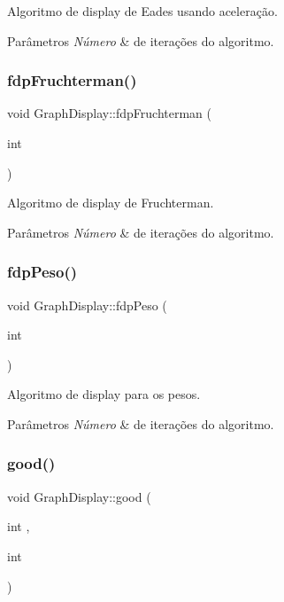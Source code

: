 Algoritmo de display de Eades usando aceleração. 
\begin{DoxyParams}{Parâmetros}
{\em Número} & de iterações do algoritmo. \\
\hline
\end{DoxyParams}
\mbox{\label{classGraphDisplay_aaf2ed129c6647b38b0170133ae4f0823}} 
\subsubsection{\texorpdfstring{fdp\+Fruchterman()}{fdpFruchterman()}}
{\footnotesize\ttfamily void Graph\+Display\+::fdp\+Fruchterman (\begin{DoxyParamCaption}\item[{int}]{ }\end{DoxyParamCaption})}

Algoritmo de display de Fruchterman. 
\begin{DoxyParams}{Parâmetros}
{\em Número} & de iterações do algoritmo. \\
\hline
\end{DoxyParams}
\mbox{\label{classGraphDisplay_a9d55e916fea8b749eaee51def8d004d3}} 
\subsubsection{\texorpdfstring{fdp\+Peso()}{fdpPeso()}}
{\footnotesize\ttfamily void Graph\+Display\+::fdp\+Peso (\begin{DoxyParamCaption}\item[{int}]{ }\end{DoxyParamCaption})}

Algoritmo de display para os pesos. 
\begin{DoxyParams}{Parâmetros}
{\em Número} & de iterações do algoritmo. \\
\hline
\end{DoxyParams}
\mbox{\label{classGraphDisplay_a27d6e383e51648eff72a3ac43abc5c0c}} 
\subsubsection{\texorpdfstring{good()}{good()}}
{\footnotesize\ttfamily void Graph\+Display\+::good (\begin{DoxyParamCaption}\item[{int}]{,  }\item[{int}]{ }\end{DoxyParamCaption})}

